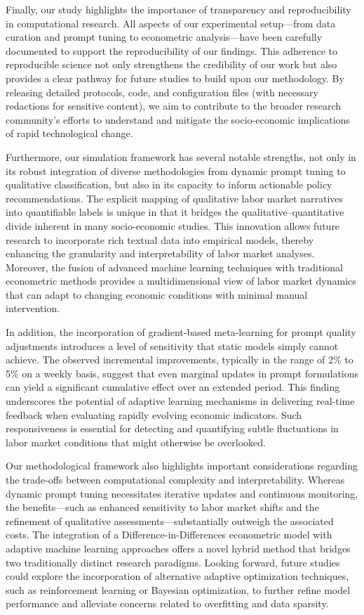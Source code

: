 \documentclass{article}
\begin{document}
Finally, our study highlights the importance of transparency and reproducibility in computational research. All aspects of our experimental setup—from data curation and prompt tuning to econometric analysis—have been carefully documented to support the reproducibility of our findings. This adherence to reproducible science not only strengthens the credibility of our work but also provides a clear pathway for future studies to build upon our methodology. By releasing detailed protocols, code, and configuration files (with necessary redactions for sensitive content), we aim to contribute to the broader research community’s efforts to understand and mitigate the socio-economic implications of rapid technological change.

Furthermore, our simulation framework has several notable strengths, not only in its robust integration of diverse methodologies from dynamic prompt tuning to qualitative classification, but also in its capacity to inform actionable policy recommendations. The explicit mapping of qualitative labor market narratives into quantifiable labels is unique in that it bridges the qualitative–quantitative divide inherent in many socio-economic studies. This innovation allows future research to incorporate rich textual data into empirical models, thereby enhancing the granularity and interpretability of labor market analyses. Moreover, the fusion of advanced machine learning techniques with traditional econometric methods provides a multidimensional view of labor market dynamics that can adapt to changing economic conditions with minimal manual intervention.

In addition, the incorporation of gradient-based meta-learning for prompt quality adjustments introduces a level of sensitivity that static models simply cannot achieve. The observed incremental improvements, typically in the range of 2\% to 5\% on a weekly basis, suggest that even marginal updates in prompt formulations can yield a significant cumulative effect over an extended period. This finding underscores the potential of adaptive learning mechanisms in delivering real-time feedback when evaluating rapidly evolving economic indicators. Such responsiveness is essential for detecting and quantifying subtle fluctuations in labor market conditions that might otherwise be overlooked.

Our methodological framework also highlights important considerations regarding the trade-offs between computational complexity and interpretability. Whereas dynamic prompt tuning necessitates iterative updates and continuous monitoring, the benefits—such as enhanced sensitivity to labor market shifts and the refinement of qualitative assessments—substantially outweigh the associated costs. The integration of a Difference-in-Differences econometric model with adaptive machine learning approaches offers a novel hybrid method that bridges two traditionally distinct research paradigms. Looking forward, future studies could explore the incorporation of alternative adaptive optimization techniques, such as reinforcement learning or Bayesian optimization, to further refine model performance and alleviate concerns related to overfitting and data sparsity.
\end{document}
